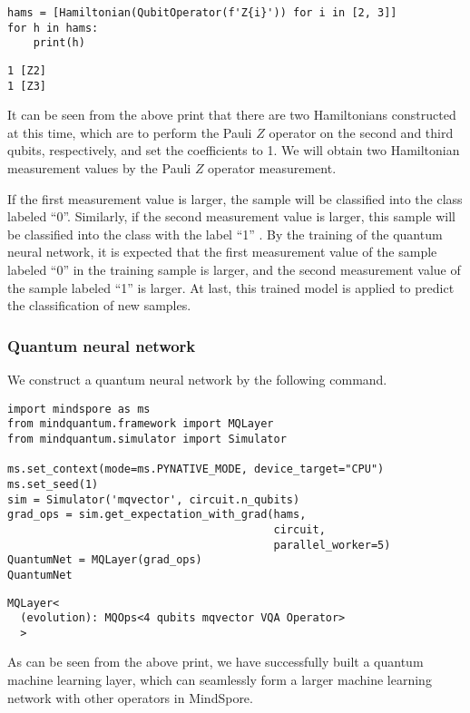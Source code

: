 \begin{lstlisting}
hams = [Hamiltonian(QubitOperator(f'Z{i}')) for i in [2, 3]]
for h in hams:
    print(h)
\end{lstlisting}

\begin{lstlisting}
1 [Z2]
1 [Z3]
\end{lstlisting}

It can be seen from the above print that there are two Hamiltonians constructed at this time, which are to perform the Pauli $Z$ operator on the second and third qubits, respectively, and set the coefficients to 1. We will obtain two Hamiltonian measurement values by the Pauli $Z$ operator measurement.

If the first measurement value is larger, the sample will be classified into the class labeled ``0''.  Similarly, if the second measurement value is larger, this sample will be classified into the class with the label ``1'' . By the training of the quantum neural network, it is expected that the first measurement value of the sample labeled ``0''  in the training sample is larger, and the second measurement value of the sample labeled ``1'' is larger. At last, this trained model is applied to predict the classification of new samples.

\subsubsection{Quantum neural network}
We construct a quantum neural network by the following command.

\begin{lstlisting}
import mindspore as ms
from mindquantum.framework import MQLayer
from mindquantum.simulator import Simulator

ms.set_context(mode=ms.PYNATIVE_MODE, device_target="CPU")
ms.set_seed(1)
sim = Simulator('mqvector', circuit.n_qubits)
grad_ops = sim.get_expectation_with_grad(hams,
                                         circuit,
                                         parallel_worker=5)
QuantumNet = MQLayer(grad_ops)
QuantumNet
\end{lstlisting}

\begin{lstlisting}
MQLayer<
  (evolution): MQOps<4 qubits mqvector VQA Operator>
  >
\end{lstlisting}

As can be seen from the above print, we have successfully built a quantum machine learning layer, which can seamlessly form a larger machine learning network with other operators in MindSpore.


